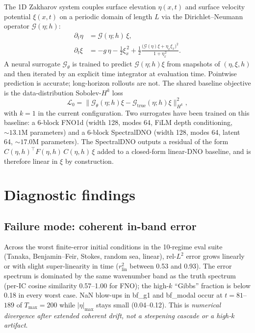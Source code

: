 \documentclass[11pt,letterpaper]{article}
\newcommand{\Gop}{\mathcal{G}}
\newcommand{\Half}{\tfrac{1}{2}}
\begin{document}
The 1D Zakharov system couples surface elevation $\eta(x,t)$ and surface
velocity potential $\xi(x,t)$ on a periodic domain of length $L$ via the
Dirichlet--Neumann operator $\Gop(\eta;h)$:
\begin{align}
\partial_t \eta &= \Gop(\eta; h)\,\xi,\\
\partial_t \xi &= -g\,\eta - \Half\xi_x^{\,2}
   + \Half\frac{\big(\Gop(\eta)\xi + \eta_x\xi_x\big)^{2}}{1 + \eta_x^{\,2}}.
\end{align}
A neural surrogate $\Gop_\theta$ is trained to predict $\Gop(\eta;h)\xi$
from snapshots of $(\eta,\xi,h)$ and then iterated by an explicit time
integrator at evaluation time. Pointwise prediction is accurate;
long-horizon rollouts are not. The shared baseline objective is the
data-distribution Sobolev-$H^{k}$ loss
\[
  \mathcal{L}_{0} = \big\| \Gop_\theta(\eta;h)\xi - \Gop_{\mathrm{true}}(\eta;h)\xi \big\|_{H^{k}}^{2},
\]
with $k=1$ in the current configuration. Two surrogates have been trained
on this baseline: a 6-block FNO1d (width 128, modes 64, FiLM depth
conditioning, $\sim 13.1$M parameters) and a 6-block SpectralDNO
(width 128, modes 64, latent 64, $\sim 17.0$M parameters). The SpectralDNO
outputs a residual of the form $C(\eta,h)^{\top} F(\eta,h)\,C(\eta,h)\,\xi$
added to a closed-form linear-DNO baseline, and is therefore linear in
$\xi$ by construction.

\section{Diagnostic findings}
\label{sec:diagnostics}

\subsection{Failure mode: coherent in-band error}

Across the worst finite-error initial conditions in the 10-regime eval
suite (Tanaka, Benjamin--Feir, Stokes, random sea, linear), rel-$L^{2}$
error grows linearly or with slight super-linearity in time
($r^{2}_{\mathrm{lin}}$ between 0.53 and 0.93). The error spectrum is
dominated by the same wavenumber band as the truth spectrum (per-IC
cosine similarity 0.57--1.00 for FNO); the high-$k$ ``Gibbs'' fraction is
below 0.18 in every worst case. NaN blow-ups in bf\_g1 and bf\_modal
occur at $t = 81$--$189$ of $T_{\max}=200$ while $|\eta|_{\max}$ stays
small (0.04--0.12). This is \emph{numerical divergence after extended
coherent drift, not a steepening cascade or a high-$k$ artifact}.
\end{document}
